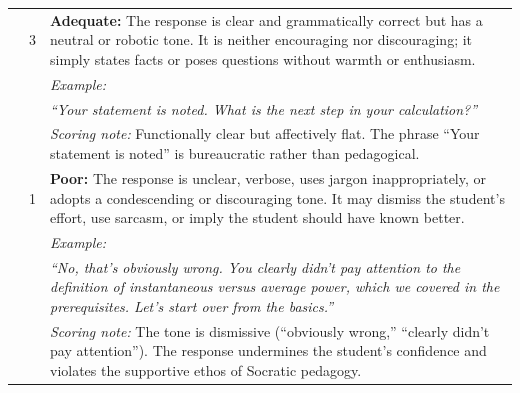 \begin{longtable}{@{}p{3cm} p{1cm} p{10cm}@{}}
\addlinespace
& 3 & \textbf{Adequate:} The response is clear and grammatically correct but has a neutral or robotic tone. It is neither encouraging nor discouraging; it simply states facts or poses questions without warmth or enthusiasm. \\
& & \textit{Example:} \\
& & \textit{``Your statement is noted. What is the next step in your calculation?''} \\
& & \textit{Scoring note:} Functionally clear but affectively flat. The phrase ``Your statement is noted'' is bureaucratic rather than pedagogical. \\
\addlinespace
& 1 & \textbf{Poor:} The response is unclear, verbose, uses jargon inappropriately, or adopts a condescending or discouraging tone. It may dismiss the student's effort, use sarcasm, or imply the student should have known better. \\
& & \textit{Example:} \\
& & \textit{``No, that's obviously wrong. You clearly didn't pay attention to the definition of instantaneous versus average power, which we covered in the prerequisites. Let's start over from the basics.''} \\
& & \textit{Scoring note:} The tone is dismissive (``obviously wrong,'' ``clearly didn't pay attention''). The response undermines the student's confidence and violates the supportive ethos of Socratic pedagogy. \\
\midrule


\end{longtable}
